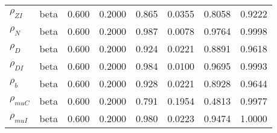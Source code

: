 \begin{center}
\begin{longtable}{llcccccc}
${\rho_{ZI}}$ & beta &   0.600 & 0.2000 &   0.865& 0.0355 &  0.8058 &  0.9222 \\ 
${\rho_N}$ & beta &   0.600 & 0.2000 &   0.987& 0.0078 &  0.9764 &  0.9998 \\ 
${\rho_D}$ & beta &   0.600 & 0.2000 &   0.924& 0.0221 &  0.8891 &  0.9618 \\ 
${\rho_{DI}}$ & beta &   0.600 & 0.2000 &   0.984& 0.0100 &  0.9695 &  0.9993 \\ 
${\rho_b}$ & beta &   0.600 & 0.2000 &   0.928& 0.0221 &  0.8928 &  0.9644 \\ 
${\rho_{muC}}$ & beta &   0.600 & 0.2000 &   0.791& 0.1954 &  0.4813 &  0.9977 \\ 
${\rho_{muI}}$ & beta &   0.600 & 0.2000 &   0.980& 0.0223 &  0.9474 &  1.0000 \\ 
\end{longtable}
 \end{center}
